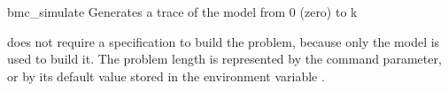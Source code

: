 \begin{nusmvCommand}{bmc\_simulate} {Generates a trace of the model from 0 (zero) to k}


 does not require a specification to build the
problem, because only the model is used to build it.  The problem
length is represented by the  command parameter, or by
its default value stored in the environment variable
.

\begin{cmdOpt}
\end{cmdOpt}

\end{nusmvCommand}

